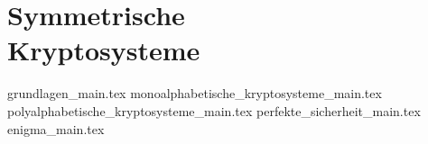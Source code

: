 
\part[Symmetrische Kryptosysteme]{Symmetrische\\Kryptosysteme}
\label{part-symmetrische-kryptosysteme}

{grundlagen_main.tex}
{monoalphabetische_kryptosysteme_main.tex}
{polyalphabetische_kryptosysteme_main.tex}
{perfekte_sicherheit_main.tex}
{enigma_main.tex}